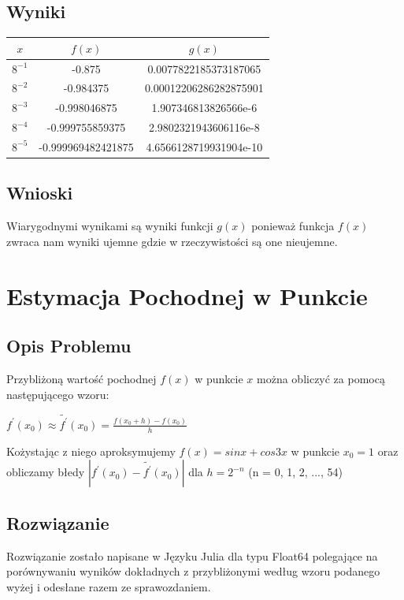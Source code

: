 \documentclass{article}
\begin{document}
\subsection{Wyniki}
        \begin{center}
        \begin{tabular}{|c||c|c|}
        \hline
            $x$ & $f(x)$ & $g(x)$ \\
            \hline\hline
            $8^{-1}$ & -0.875 & 0.0077822185373187065 \\
             \hline
             $8^{-2}$ & -0.984375 & 0.00012206286282875901\\
             \hline
             $8^{-3}$ & -0.998046875 & 1.907346813826566e-6\\
             \hline
             $8^{-4}$ & -0.999755859375 & 2.9802321943606116e-8\\
            \hline
             $8^{-5}$ & -0.999969482421875 & 4.6566128719931904e-10\\
        \hline
        \end{tabular}
    \end{center}
\subsection{Wnioski}
    Wiarygodnymi wynikami są wyniki funkcji $g(x)$ ponieważ funkcja $f(x)$ zwraca nam wyniki ujemne gdzie w rzeczywistości są one nieujemne.

\section{Estymacja Pochodnej w Punkcie}
\subsection{Opis Problemu}
    Przybliżoną wartość pochodnej $f(x)$ w punkcie $x$ można obliczyć za pomocą następującego wzoru:\\
    \begin{center}
        $f^{'}(x_0)\approx\tilde{f^{'}}(x_0) = \frac{f(x_0+h) - f(x_0)}{h}$
    \end{center}
    Kożystając z niego aproksymujemy $f(x)=sinx+cos3x$ w punkcie $x_0 = 1$ oraz obliczamy błedy $|f^{'}(x_0) - \tilde{f^{'}}(x_0)|$ dla $h=2^{-n}$ (n = 0, 1, 2, ..., 54)
\subsection{Rozwiązanie}
    Rozwiązanie zostało napisane w Języku Julia dla typu Float64 polegające na porównywaniu wyników dokładnych z przybliżonymi według wzoru podanego wyżej i odesłane razem ze sprawozdaniem.
\end{document}

